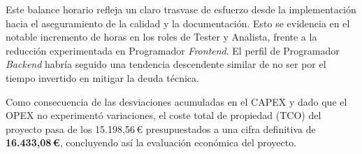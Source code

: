 \begin{table}[H]
  \centering
  \small
  \renewcommand{\arraystretch}{1.3}
  \caption{Comparativa de dedicación y costes de personal por rol.}
  \label{tab:horas_roles_previstas_reales}
\end{table}

Este balance horario refleja un claro trasvase de esfuerzo desde la implementación hacia el aseguramiento de la calidad y la documentación. Esto se evidencia en el notable incremento de horas en los roles de Tester y Analista, frente a la reducción experimentada en Programador \textit{Frontend}. El perfil de Programador \textit{Backend} habría seguido una tendencia descendente similar de no ser por el tiempo invertido en mitigar la deuda técnica.

Como consecuencia de las desviaciones acumuladas en el CAPEX y dado que el OPEX no experimentó variaciones, el coste total de propiedad (TCO) del proyecto pasa de los 15.198,56\,\euro{} presupuestados a una cifra definitiva de \textbf{16.433,08\,\euro{}}, concluyendo así la evaluación económica del proyecto.

